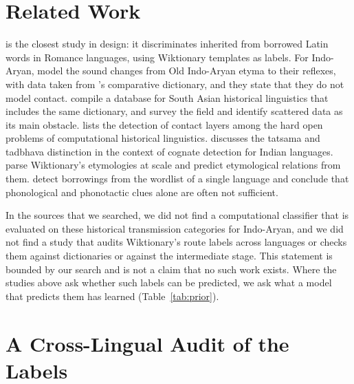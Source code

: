 \documentclass[11pt]{article}
\begin{document}
\section{Related Work}

\citet{cristea2021inherited} is the closest study in design: it discriminates inherited from borrowed Latin words in Romance languages, using Wiktionary templates as labels. For Indo-Aryan, \citet{cathcart2020disentangling} model the sound changes from Old Indo-Aryan etyma to their reflexes, with data taken from \citeauthor{turner1966cdial}'s comparative dictionary, and they state that they do not model contact. \citet{arora2023jambu} compile a database for South Asian historical linguistics that includes the same dictionary, and \citet{arora2022computational} survey the field and identify scattered data as its main obstacle. \citet{list2024openproblems} lists the detection of contact layers among the hard open problems of computational historical linguistics. \citet[\S4.1]{kanojia2021thesis} discusses the tatsama and tadbhava distinction in the context of cognate detection for Indian languages. \citet{wu2020computational} parse Wiktionary's etymologies at scale and predict etymological relations from them. \citet{miller2020lexical} detect borrowings from the wordlist of a single language and conclude that phonological and phonotactic clues alone are often not sufficient.

In the sources that we searched, we did not find a computational classifier that is evaluated on these historical transmission categories for Indo-Aryan, and we did not find a study that audits Wiktionary's route labels across languages or checks them against dictionaries or against the intermediate stage. This statement is bounded by our search and is not a claim that no such work exists. Where the studies above ask whether such labels can be predicted, we ask what a model that predicts them has learned (Table~\ref{tab:prior}).

\section{A Cross-Lingual Audit of the Labels}
\label{sec:audit}
\end{document}
